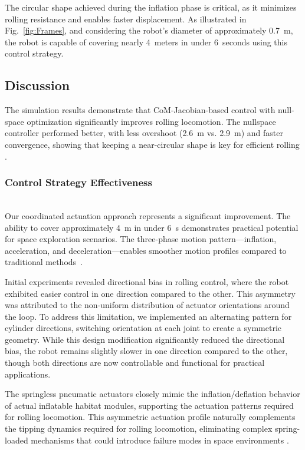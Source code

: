 \documentclass[a4paper, 10pt, conference]{ieeeconf}
\begin{document}
The circular shape achieved during the inflation phase is critical, as it minimizes rolling resistance and enables faster displacement. As illustrated in Fig.~\ref{fig:Frames}, and considering the robot’s diameter of approximately 0.7~m, the robot is capable of covering nearly 4~meters in under 6~seconds using this control strategy.

\subsection{Discussion}

The simulation results demonstrate that CoM-Jacobian-based control with null-space optimization significantly improves rolling locomotion. The nullspace controller performed better, with less overshoot (2.6~m vs. 2.9~m) and faster convergence, showing that keeping a near-circular shape is key for efficient rolling \cite{b3}.

\subsubsection{Control Strategy Effectiveness}
\\
Our coordinated actuation approach represents a significant improvement. The ability to cover approximately 4~m in under 6~s demonstrates practical potential for space exploration scenarios. The three-phase motion pattern—inflation, acceleration, and deceleration—enables smoother motion profiles compared to traditional methods~\cite{b1}.

Initial experiments revealed directional bias in rolling control, where the robot exhibited easier control in one direction compared to the other. This asymmetry was attributed to the non-uniform distribution of actuator orientations around the loop. To address this limitation, we implemented an alternating pattern for cylinder directions, switching orientation at each joint to create a symmetric geometry. While this design modification significantly reduced the directional bias, the robot remains slightly slower in one direction compared to the other, though both directions are now controllable and functional for practical applications.

The springless pneumatic actuators closely mimic the inflation/deflation behavior of actual inflatable habitat modules, supporting the actuation patterns required for rolling locomotion. This asymmetric actuation profile naturally complements the tipping dynamics required for rolling locomotion, eliminating complex spring-loaded mechanisms that could introduce failure modes in space environments \cite{b13}.
\end{document}
